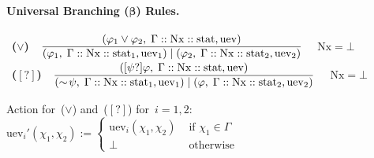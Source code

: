 \documentclass{entcs}
\newcommand{\pneg}[1]{\sim\!#1}
\newcommand{\por}[2]{#1 \lor #2}
\newcommand{\paa}[2]{[#1] #2}
\newcommand{\pip}[1]{#1?}
\newcommand{\tnode}[3]{(#1 :: #2 :: #3)}
\newcommand{\tnext}{\mathrm{Nx}}
\newcommand{\tmrk}{\mathrm{stat}}
\newcommand{\tuev}{\mathrm{uev}}
\newcommand{\tbeta}{\boldsymbol{\beta}}
\newcommand{\tror}{$\por{}{}$}
\newcommand{\trai}{$\paa{\pip{}}{}$}
\newcommand{\ds}{\displaystyle\strut}
\newcommand{\ruleone}[3]{
\mbox{ {\bf #1} \ $\frac{\ds \mbox{$#2$}}{\ds \mbox{$#3$}}$}}
\begin{document}
\paragraph{Universal Branching ($\tbeta$) Rules.}

\begin{center} 
  \ruleone{(\tror{})}
  {\tnode{\por{\varphi_1}{\varphi_2} , \; \Gamma}{\tnext}{\tmrk, \tuev}}
  {\tnode{\varphi_1 , \; \Gamma}{\tnext}{\tmrk_1, \tuev_1}
    \mid
    \tnode{\varphi_2 , \; \Gamma}{\tnext}{\tmrk_2, \tuev_2}}
  $\quad \tnext = \bot$
  \\[1em]
  \ruleone{(\trai{})}
  {\tnode{\paa{\pip{\psi}}{\varphi} , \; \Gamma}{\tnext}{\tmrk, \tuev}}
  {\tnode{\pneg{\psi} , \; \Gamma}{\tnext}{\tmrk_1, \tuev_1}
    \mid
    \tnode{\varphi , \; \Gamma}{\tnext}{\tmrk_2, \tuev_2}}
  $\quad \tnext = \bot$
  \\[1em]
\end{center}
Action for~(\tror{}) and~(\trai{}) for~$i = 1, 2$:
$\tuev_i'(\chi_1, \chi_2) := 
\left\{
  \begin{array}{ll}
    \tuev_i(\chi_1, \chi_2) & \text{ if } \chi_1 \in \Gamma\\
    \bot & \text{ otherwise}
  \end{array}
\right .$
\end{document}
